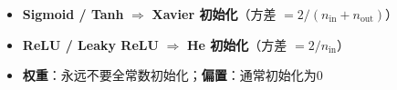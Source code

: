 \documentclass[a4paper,11pt]{ctexart}
\begin{document}
\begin{solutionbox}[参考答案与详细解析]
    \begin{keybox}[初始化方法选择口诀]
        \begin{itemize}
            \item \textbf{Sigmoid / Tanh} $\Rightarrow$ \textbf{Xavier 初始化}（方差 $= 2/(n_\text{in}+n_\text{out})$）
            \item \textbf{ReLU / Leaky ReLU} $\Rightarrow$ \textbf{He 初始化}（方差 $= 2/n_\text{in}$）
            \item \textbf{权重}：永远不要全常数初始化；\textbf{偏置}：通常初始化为0
        \end{itemize}
    \end{keybox}
\end{solutionbox}


\end{document}
